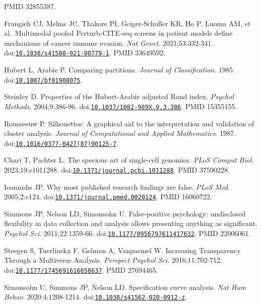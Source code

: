 \documentclass[11pt]{article}
\begin{document}
\begin{enumerate}[label={[\arabic*]},leftmargin=2.6em,labelsep=0.5em,itemsep=1.5pt]
  PMID 32855387.
\item
  Frangieh CJ, Melms JC, Thakore PI, Geiger-Schuller KR, Ho P, Luoma AM,
  et al.~Multimodal pooled Perturb-CITE-seq screens in patient models
  define mechanisms of cancer immune evasion. \emph{Nat Genet}.
  2021;53:332-341.
  doi:\href{https://doi.org/10.1038/s41588-021-00779-1}{\nolinkurl{10.1038/s41588-021-00779-1}}.
  PMID 33649592.
\item
  Hubert L, Arabie P. Comparing partitions. \emph{Journal of
  Classification}. 1985.
  doi:\href{https://doi.org/10.1007/bf01908075}{\nolinkurl{10.1007/bf01908075}}.
\item
  Steinley D. Properties of the Hubert-Arabie adjusted Rand index.
  \emph{Psychol Methods}. 2004;9:386-96.
  doi:\href{https://doi.org/10.1037/1082-989X.9.3.386}{\nolinkurl{10.1037/1082-989X.9.3.386}}.
  PMID 15355155.
\item
  Rousseeuw P. Silhouettes: A graphical aid to the interpretation and
  validation of cluster analysis. \emph{Journal of Computational and
  Applied Mathematics}. 1987.
  doi:\href{https://doi.org/10.1016/0377-0427(87)90125-7}{\nolinkurl{10.1016/0377-0427(87)90125-7}}.
\item
  Chari T, Pachter L. The specious art of single-cell genomics.
  \emph{PLoS Comput Biol}. 2023;19:e1011288.
  doi:\href{https://doi.org/10.1371/journal.pcbi.1011288}{\nolinkurl{10.1371/journal.pcbi.1011288}}.
  PMID 37590228.
\item
  Ioannidis JP. Why most published research findings are false.
  \emph{PLoS Med}. 2005;2:e124.
  doi:\href{https://doi.org/10.1371/journal.pmed.0020124}{\nolinkurl{10.1371/journal.pmed.0020124}}.
  PMID 16060722.
\item
  Simmons JP, Nelson LD, Simonsohn U. False-positive psychology:
  undisclosed flexibility in data collection and analysis allows
  presenting anything as significant. \emph{Psychol Sci}.
  2011;22:1359-66.
  doi:\href{https://doi.org/10.1177/0956797611417632}{\nolinkurl{10.1177/0956797611417632}}.
  PMID 22006061.
\item
  Steegen S, Tuerlinckx F, Gelman A, Vanpaemel W. Increasing
  Transparency Through a Multiverse Analysis. \emph{Perspect Psychol
  Sci}. 2016;11:702-712.
  doi:\href{https://doi.org/10.1177/1745691616658637}{\nolinkurl{10.1177/1745691616658637}}.
  PMID 27694465.
\item
  Simonsohn U, Simmons JP, Nelson LD. Specification curve analysis.
  \emph{Nat Hum Behav}. 2020;4:1208-1214.
  doi:\href{https://doi.org/10.1038/s41562-020-0912-z}{\nolinkurl{10.1038/s41562-020-0912-z}}.

\end{enumerate}
\end{document}
